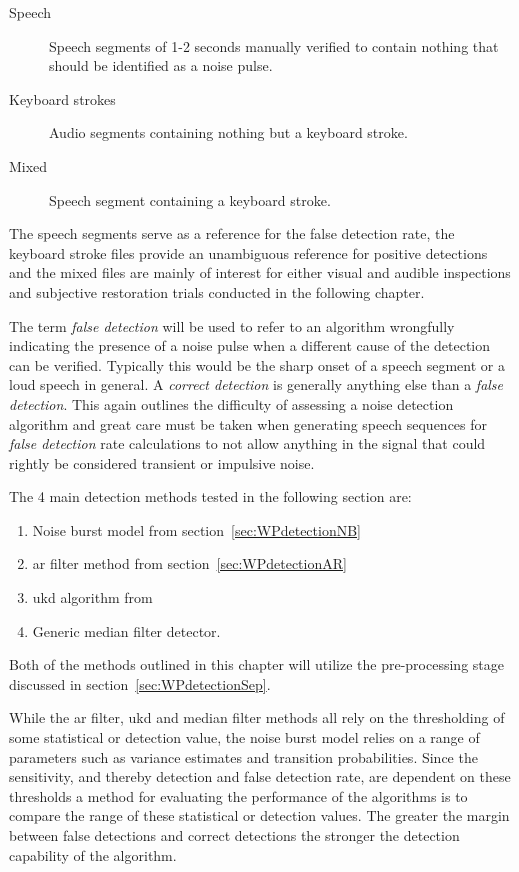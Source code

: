 \begin{description}
  \item[Speech] Speech segments of 1-2 seconds manually verified to contain nothing that should be identified as a noise pulse.
  \item[Keyboard strokes] Audio segments containing nothing but a keyboard stroke.
  \item[Mixed] Speech segment containing a keyboard stroke.
\end{description}

The speech segments serve as a reference for the false detection rate, the keyboard stroke files provide an unambiguous reference for positive detections and the mixed files are mainly of interest for either visual and audible inspections and subjective restoration trials conducted in the following chapter.

The term \emph{false detection} will be used to refer to an algorithm wrongfully indicating the presence of a noise pulse when a different cause of the detection can be verified. Typically this would be the sharp onset of a speech segment or a loud speech in general. A \emph{correct detection} is generally anything else than a \emph{false detection}. This again outlines the difficulty of assessing a noise detection algorithm and great care must be taken when generating speech sequences for \emph{false detection} rate calculations to not allow anything in the signal that could rightly be considered transient or impulsive noise.

The 4 main detection methods tested in the following section are:
\begin{enumerate}
  \item Noise burst model from section~\ref{sec:WPdetectionNB}
  \item \gls{ar} filter method from section~\ref{sec:WPdetectionAR}
  \item \gls{ukd} algorithm from \cite{Subramanya2007}
  \item Generic median filter detector.
\end{enumerate}
Both of the methods outlined in this chapter will utilize the pre-processing stage discussed in section~\ref{sec:WPdetectionSep}.

While the \gls{ar} filter, \gls{ukd} and median filter methods all rely on the thresholding of some statistical or detection value, the noise burst model relies on a range of parameters such as variance estimates and transition probabilities. Since the sensitivity, and thereby detection and false detection rate, are dependent on these thresholds a method for evaluating the performance of the algorithms is to compare the range of these statistical or detection values. The greater the margin between false detections and correct detections the stronger the detection capability of the algorithm.


